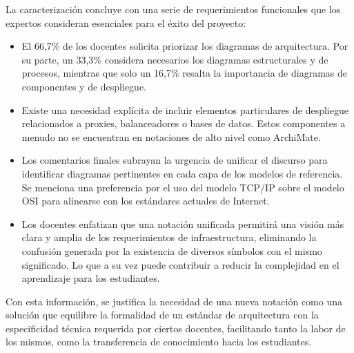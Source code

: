 La caracterización concluye con una serie de requerimientos funcionales que los expertos consideran esenciales para el éxito del proyecto:




\begin{itemize}
	\item El 66,7\% de los docentes solicita priorizar los diagramas de arquitectura. Por su parte, un 33,3\% considera necesarios los diagramas estructurales y de procesos, mientras que solo un 16,7\% resalta la importancia de diagramas de componentes y de despliegue.
	\item Existe una necesidad explícita de incluir elementos particulares de despliegue relacionados a proxies, balanceadores o bases de datos. Estos componentes a menudo no se encuentran en notaciones de alto nivel como ArchiMate.
	\item Los comentarios finales subrayan la urgencia de unificar el discurso para identificar diagramas pertinentes en cada capa de los modelos de referencia. Se menciona una preferencia por el uso del modelo TCP/IP sobre el modelo OSI para alinearse con los estándares actuales de Internet.
	\item Los docentes enfatizan que una notación unificada permitirá una visión más clara y amplia de los requerimientos de infraestructura, eliminando la confusión generada por la existencia de diversos símbolos con el mismo significado. Lo que a su vez puede contribuir a reducir la complejidad en el aprendizaje para los estudiantes.
\end{itemize}

Con esta información, se justifica la necesidad de una nueva notación como una solución que equilibre la formalidad de un estándar de arquitectura con la especificidad técnica requerida por ciertos docentes, facilitando tanto la labor de los mismos, como la transferencia de conocimiento hacia los estudiantes.
